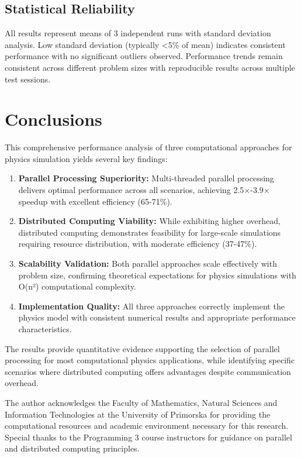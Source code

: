 \documentclass[sigconf]{acmart}
\begin{document}
\subsection{Statistical Reliability}

All results represent means of 3 independent runs with standard deviation analysis. Low standard deviation (typically <5\% of mean) indicates consistent performance with no significant outliers observed. Performance trends remain consistent across different problem sizes with reproducible results across multiple test sessions.

\section{Conclusions}

This comprehensive performance analysis of three computational approaches for physics simulation yields several key findings:

\begin{enumerate}
    \item \textbf{Parallel Processing Superiority:} Multi-threaded parallel processing delivers optimal performance across all scenarios, achieving 2.5×-3.9× speedup with excellent efficiency (65-71\%).
    
    \item \textbf{Distributed Computing Viability:} While exhibiting higher overhead, distributed computing demonstrates feasibility for large-scale simulations requiring resource distribution, with moderate efficiency (37-47\%).
    
    \item \textbf{Scalability Validation:} Both parallel approaches scale effectively with problem size, confirming theoretical expectations for physics simulations with O(n²) computational complexity.
    
    \item \textbf{Implementation Quality:} All three approaches correctly implement the physics model with consistent numerical results and appropriate performance characteristics.
\end{enumerate}

The results provide quantitative evidence supporting the selection of parallel processing for most computational physics applications, while identifying specific scenarios where distributed computing offers advantages despite communication overhead.

\begin{acks}
The author acknowledges the Faculty of Mathematics, Natural Sciences and Information Technologies at the University of Primorska for providing the computational resources and academic environment necessary for this research. Special thanks to the Programming 3 course instructors for guidance on parallel and distributed computing principles.
\end{acks}

\end{document}
